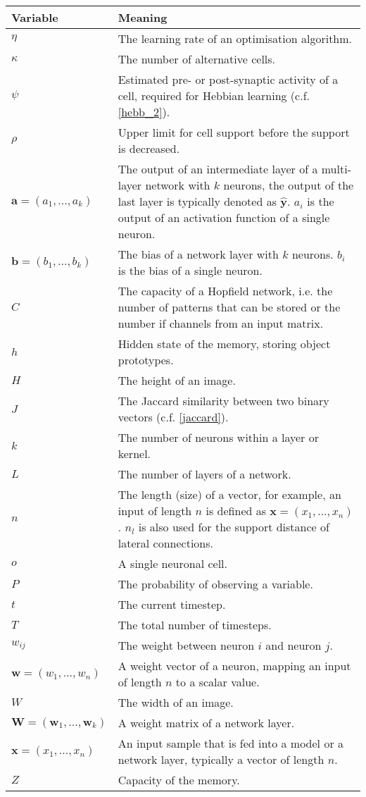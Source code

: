 \begin{tabular}{ p{3cm} p{11cm} }
	\textbf{Variable} & \textbf{Meaning}\\
	\hline
	$\eta$ & The learning rate of an optimisation algorithm.\\
    $\kappa$ & The number of alternative cells.\\
    $\psi$ & Estimated pre- or post-synaptic activity of a cell, required for Hebbian learning (c.f. \eqref{hebb_2}).\\
    $\rho$ & Upper limit for cell support before the support is decreased.\\
	$\boldsymbol{a} = (a_1, ..., a_k)$ & The output of an intermediate layer of a multi-layer network with $k$ neurons, the output of the last layer is typically denoted as $\boldsymbol{\hat{y}}$. $a_i$ is the output of an activation function of a single neuron.\\
	$\boldsymbol{b} = (b_1, ..., b_k)$ & The bias of a network layer with 
    $k$ neurons. $b_i$ is the bias of a single neuron.\\
    $C$ & The capacity of a Hopfield network, i.e. the number of patterns that can be stored or the number if channels from an input matrix.\\
    $h$ & Hidden state of the memory, storing object prototypes.\\
    $H$ & The height of an image.\\
    $J$ & The Jaccard similarity between two binary vectors (c.f. \eqref{jaccard}).\\
    $k$ & The number of neurons within a layer or kernel.\\
    $L$ & The number of layers of a network.\\
    $n$ & The length (size) of a vector, for example, an input of length $n$ is defined as $\boldsymbol{x} = (x_1, ..., x_n)$. $n_l$ is also used for the support distance of lateral connections.\\
    $o$ & A single neuronal cell.\\
    $P$ & The probability of observing a variable.\\
    $t$ & The current timestep.\\
    $T$ & The total number of timesteps.\\
    $w_{ij}$ & The weight between neuron $i$ and neuron $j$.\\
	$\boldsymbol{w} = (w_1, ..., w_n)$ & A weight vector of a neuron, mapping an input of length $n$ to a scalar value.\\
    $W$ & The width of an image.\\
	$\boldsymbol{W} = (\boldsymbol{w}_1, ..., \boldsymbol{w}_k)$ & A weight matrix of a network layer.\\
    $\boldsymbol{x} = (x_1, ..., x_n)$ & An input sample that is fed into a model or a network layer, typically a vector of length $n$.\\
    $Z$ & Capacity of the memory.\\
 \end{tabular}
 
